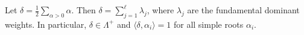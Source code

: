 Let $\delta = \frac{1}{2} \sum_{\alpha > 0} \alpha$. Then $\delta = \sum_{j=1}^\ell \lambda_j$, where $\lambda_j$ are the fundamental dominant weights. In particular, $\delta \in \Lambda^+$ and $\langle \delta, \alpha_i \rangle = 1$ for all simple roots $\alpha_i$.
